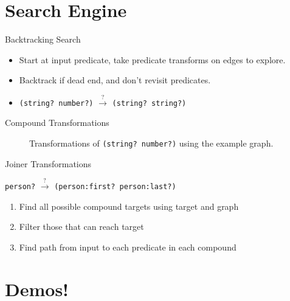 \documentclass[11pt]{beamer}
\begin{document}
\section{Search Engine}

\begin{frame}{Backtracking Search}
    \begin{itemize}
        \item Start at input predicate, take predicate transforms on edges to explore.
        \medskip
        \item Backtrack if dead end, and don't revisit predicates.
        \medskip
        \item \texttt{(string? number?)} $\overset{?}{\longrightarrow}$ \texttt{(string? string?)}
    \end{itemize}
\end{frame}

\begin{frame}{Compound Transformations}
    \begin{figure}[h!]
        \centering

        \resizebox{11cm}{!} {
          
        }

        \caption{Transformations of \texttt{(string? number?)} using the example graph.}
    \end{figure}
\end{frame}

\begin{frame}{Joiner Transformations}

\texttt{person?} $\overset{?}{\longrightarrow}$ \texttt{(person:first? person:last?)}

\bigskip

\begin{enumerate}
    \medskip
    \item Find all possible compound targets using target and graph
    \medskip
    \item Filter those that can reach target
    \medskip
    \item Find path from input to each predicate in each compound
\end{enumerate}

\end{frame}

\section{Demos!}
\end{document}
